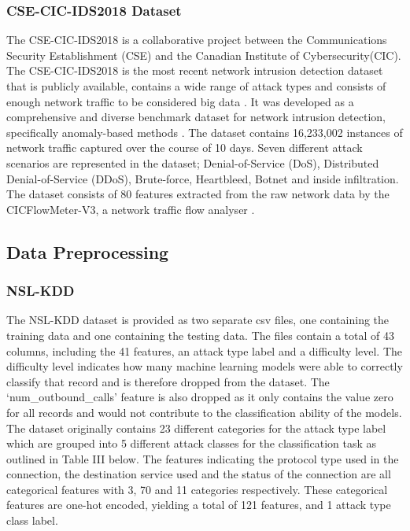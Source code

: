 \documentclass[conference]{IEEEtran}
\begin{document}
\subsubsection{CSE-CIC-IDS2018 Dataset}
\noindent The CSE-CIC-IDS2018 is a collaborative project between the Communications Security Establishment (CSE) and the Canadian Institute of Cybersecurity(CIC). The CSE-CIC-IDS2018 is the most recent network intrusion detection dataset that is publicly available, contains a wide range of attack types and consists of enough network traffic to be considered big data \cite{b17}. It was developed as a comprehensive and diverse benchmark dataset for network intrusion detection, specifically anomaly-based methods \cite{b16}. The dataset contains 16,233,002 instances of network traffic captured over the course of 10 days. Seven different attack scenarios are represented in the dataset; Denial-of-Service (DoS), Distributed Denial-of-Service (DDoS), Brute-force, Heartbleed, Botnet and inside infiltration. The dataset consists of 80 features extracted from the raw network data by the CICFlowMeter-V3, a network traffic flow analyser \cite{b16}.


\subsection{Data Preprocessing}
\subsubsection{NSL-KDD}
\noindeny The NSL-KDD dataset is provided as two separate csv files, one containing the training data and one containing the testing data. The files contain a total of 43 columns, including the 41 features, an attack type label and a difficulty level. The difficulty level indicates how many machine learning models were able to correctly classify that record and is therefore dropped from the dataset. The ‘num\_outbound\_calls’ feature is also dropped as it only contains the value zero for all records and would not contribute to the classification ability of the models. The dataset originally contains 23 different categories for the attack type label which are grouped into 5 different attack classes for the classification task as outlined in Table III below.
The features indicating the protocol type used in the connection, the destination service used and the status of the connection are all categorical features with 3, 70 and 11 categories respectively. These categorical features are one-hot encoded, yielding a total of 121 features, and 1 attack type class label.\\ 
\end{document}
